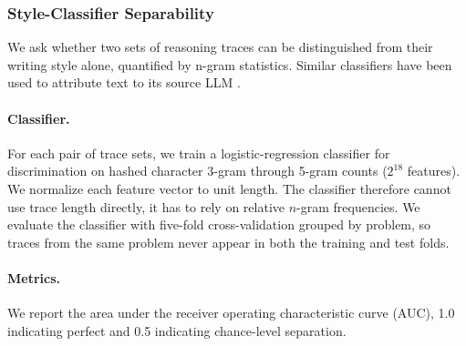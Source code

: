 


\subsubsection{Style-Classifier Separability}\label{app:drift_classifier}

We ask whether two sets of reasoning traces can be distinguished from their writing style alone, quantified by n-gram statistics. Similar classifiers have been used to attribute text to its source LLM \citep{sun2025idiosyncrasies}.

\paragraph{Classifier.} For each pair of trace sets, we train a logistic-regression classifier for discrimination on hashed character 3-gram through 5-gram counts  ($2^{18}$ features). We normalize each feature vector to unit length. The classifier therefore cannot use trace length directly, it has to rely on relative $n$-gram frequencies. We evaluate the classifier with five-fold cross-validation grouped by problem, so traces from the same problem never appear in both the training and test folds. 

\paragraph{Metrics.} We report the area under the receiver operating characteristic curve (AUC), 1.0 indicating perfect and 0.5 indicating chance-level separation. 


